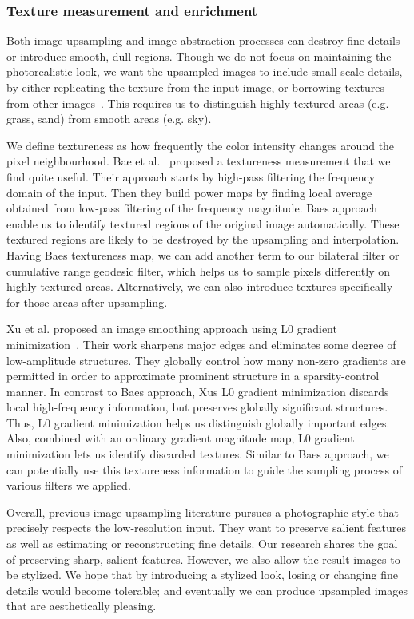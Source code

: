 \subsubsection{Texture measurement and enrichment}

Both image upsampling and image abstraction processes can destroy fine details or introduce smooth, dull regions. Though we do not focus on maintaining the photorealistic look, we want the upsampled images to include small-scale details, by either replicating the texture from the input image, or borrowing textures from other images~\cite{Jordan}. This requires us to distinguish highly-textured areas (e.g. grass, sand) from smooth areas (e.g. sky). 

We define textureness as how frequently the color intensity changes around the pixel neighbourhood. Bae et al.~\cite{Bae:2006} proposed a textureness measurement that we find quite useful. Their approach starts by high-pass filtering the frequency domain of the input. Then they build power maps by finding local average obtained from low-pass filtering of the frequency magnitude. Bae\textquotesingle s approach enable us to identify textured regions of the original image automatically. These textured regions are likely to be destroyed by the upsampling and interpolation. Having Bae\textquotesingle s textureness map, we can add another term to our bilateral filter or cumulative range geodesic filter, which helps us to sample pixels differently on highly textured areas. Alternatively, we can also introduce textures specifically for those areas after upsampling.

Xu et al. proposed an image smoothing approach using L0 gradient minimization~\cite{Xu:L0}. Their work sharpens major edges and eliminates some degree of low-amplitude structures. They globally control how many non-zero gradients are permitted in order to approximate prominent structure in a sparsity-control manner. In contrast to Bae\textquotesingle s approach, Xu\textquotesingle s L0 gradient minimization discards local high-frequency information, but preserves globally significant structures. Thus, L0 gradient minimization helps us distinguish globally important edges. Also, combined with an ordinary gradient magnitude map, L0 gradient minimization lets us identify discarded textures. Similar to Bae\textquotesingle s approach, we can potentially use this textureness information to guide the sampling process of various filters we applied.
 
Overall, previous image upsampling literature pursues a photographic style that precisely respects the low-resolution input. They want to preserve salient features as well as estimating or reconstructing fine details. Our research shares the goal of preserving sharp, salient features. However, we also allow the result images to be stylized. We hope that by introducing a stylized look, losing or changing fine details would become tolerable; and eventually we can produce upsampled images that are aesthetically pleasing.

